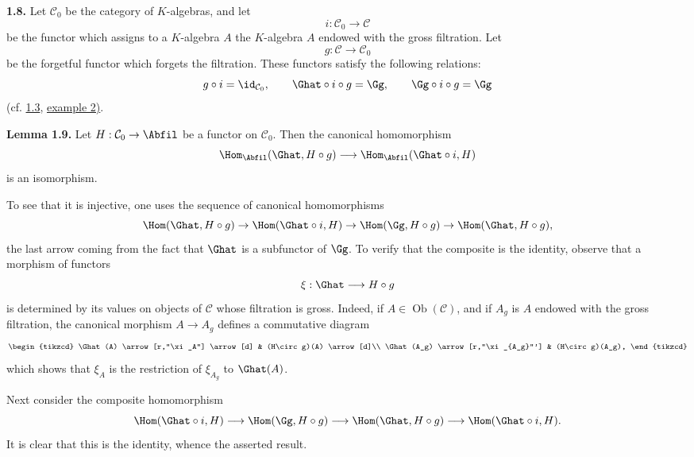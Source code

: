 \textbf{1.8.} Let \(\mathcal C_0\) be the category of \(K\)-algebras, and let
\[
  i:\mathcal C_0\longrightarrow\mathcal C
\]
be the functor which assigns to a \(K\)-algebra \(A\) the \(K\)-algebra \(A\) endowed with the gross filtration. Let
\[
  g:\mathcal C\longrightarrow\mathcal C_0
\]
be the forgetful functor which forgets the filtration. These functors satisfy the following relations:
\[
  g\circ i=\id_{\mathcal C_0},\qquad
  \Ghat\circ i\circ g=\Gg,\qquad
  \Gg\circ i\circ g=\Gg
\]
(cf. \hyperlink{sga6.e05.para.1-3}{1.3}, \hyperlink{sga6.e05.ex.1-3-2}{example 2)}.

\textbf{Lemma 1.9.} Let \(H:\mathcal C_0\to\Abfil\) be a functor on \(\mathcal C_0\). Then the canonical homomorphism
\[
  \Hom_{\Abfil}(\Ghat,H\circ g)
  \longrightarrow
  \Hom_{\Abfil}(\Ghat\circ i,H)
\]
is an isomorphism.

To see that it is injective, one uses the sequence of canonical homomorphisms
\[
 \Hom(\Ghat,H\circ g)\to
 \Hom(\Ghat\circ i,H)\to
 \Hom(\Gg,H\circ g)\to
 \Hom(\Ghat,H\circ g),
\]
the last arrow coming from the fact that \(\Ghat\) is a subfunctor of \(\Gg\). To verify that the composite is the identity, observe that a morphism of functors
\[
  \xi:\Ghat\longrightarrow H\circ g
\]
is determined by its values on objects of \(\mathcal C\) whose filtration is gross. Indeed, if \(A\in\operatorname{Ob}(\mathcal C)\), and if \(A_g\) is \(A\) endowed with the gross filtration, the canonical morphism \(A\to A_g\) defines a commutative diagram
\[
\begin{tikzcd}
\Ghat(A) \arrow[r,"\xi_A"] \arrow[d] &
(H\circ g)(A) \arrow[d]\\
\Ghat(A_g) \arrow[r,"\xi_{A_g}"'] &
(H\circ g)(A_g),
\end{tikzcd}
\]
which shows that \(\xi_A\) is the restriction of \(\xi_{A_g}\) to \(\Ghat(A)\).

Next consider the composite homomorphism
\[
  \Hom(\Ghat\circ i,H)\longrightarrow
  \Hom(\Gg,H\circ g)\longrightarrow
  \Hom(\Ghat,H\circ g)\longrightarrow
  \Hom(\Ghat\circ i,H).
\]
It is clear that this is the identity, whence the asserted result.

